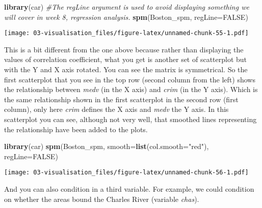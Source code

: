 \documentclass[
]{book}
\newenvironment{Shaded}{\begin{snugshade}}{\end{snugshade}}
\newcommand{\AttributeTok}[1]{\textcolor[rgb]{0.13,0.29,0.53}{#1}}
\newcommand{\CommentTok}[1]{\textcolor[rgb]{0.56,0.35,0.01}{\textit{#1}}}
\newcommand{\ConstantTok}[1]{\textcolor[rgb]{0.56,0.35,0.01}{#1}}
\newcommand{\FunctionTok}[1]{\textcolor[rgb]{0.13,0.29,0.53}{\textbf{#1}}}
\newcommand{\NormalTok}[1]{#1}
\newcommand{\OtherTok}[1]{\textcolor[rgb]{0.56,0.35,0.01}{#1}}
\newcommand{\SpecialCharTok}[1]{\textcolor[rgb]{0.81,0.36,0.00}{\textbf{#1}}}
\newcommand{\StringTok}[1]{\textcolor[rgb]{0.31,0.60,0.02}{#1}}
\begin{document}
\begin{Shaded}
\begin{Highlighting}[]
\FunctionTok{library}\NormalTok{(car)}
 \CommentTok{\#The regLine argument is used to avoid displaying something we will cover in week 8, regression analysis.}
\FunctionTok{spm}\NormalTok{(Boston\_spm, }\AttributeTok{regLine=}\ConstantTok{FALSE}\NormalTok{)}
\end{Highlighting}
\end{Shaded}

\texttt{[image: 03-visualisation\_files/figure-latex/unnamed-chunk-55-1.pdf]}

This is a bit different from the one above because rather than displaying the values of correlation coefficient, what you get is another set of scatterplot but with the Y and X axis rotated. You can see the matrix is symmetrical. So the first scatterplot that you see in the top row (second column from the left) shows the relationship between \emph{medv} (in the X axis) and \emph{crim} (in the Y axis). Which is the same relationship shown in the first scatterplot in the second row (first column), only here \emph{crim} defines the X axis and \emph{medv} the Y axis. In this scatterplot you can see, although not very well, that smoothed lines representing the relationship have been added to the plots.

\begin{Shaded}
\begin{Highlighting}[]
\FunctionTok{library}\NormalTok{(car)}
\FunctionTok{spm}\NormalTok{(Boston\_spm, }\AttributeTok{smooth=}\FunctionTok{list}\NormalTok{(}\AttributeTok{col.smooth=}\StringTok{"red"}\NormalTok{), }\AttributeTok{regLine=}\ConstantTok{FALSE}\NormalTok{)}
\end{Highlighting}
\end{Shaded}

\texttt{[image: 03-visualisation\_files/figure-latex/unnamed-chunk-56-1.pdf]}

And you can also condition in a third variable. For example, we could condition on whether the areas bound the Charles River (variable \emph{chas}).

\begin{Shaded}
\end{Shaded}
\end{document}
